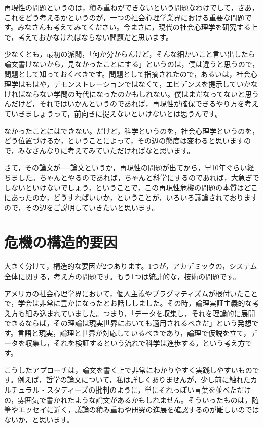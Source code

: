 \documentclass{ltjsbook}
\begin{document}
再現性の問題というのは，積み重ねができないという問題なわけでして，さあ，これをどう考えるかというのが，一つの社会心理学業界における重要な問題です。みなさんも考えてみてください。今まさに，現代の社会心理学を研究する上で，考えておかなければならない問題だと思います。

少なくとも，最初の派閥，「何か分からんけど，そんな細かいこと言い出したら論文書けないから，見なかったことにする」というのは，僕は違うと思うので，問題として知っておくべきです。問題として指摘されたので，あるいは，社会心理学はもはや，デモンストレーションではなくて，エビデンスを提示していかなければならない学問の時代になったのかもしれない。僕はまだなってないと思うんだけど，それではいかんというのであれば，再現性が確保できるやり方を考えていきましょうって，前向きに捉えないといけないとは思うんです。

なかったことにはできない。だけど，科学というのを，社会心理学というのを，どう位置づけるか，ということによって，その辺の態度は変わると思いますので，みなさんなりに考えてみていただければなと思います。

さて，その論文が──論文というか，再現性の問題が出てから，早10年ぐらい経ちました。ちゃんとやるのであれば，ちゃんと科学にするのであれば，大急ぎでしないといけないでしょう，ということで，この再現性危機の問題の本質はどこにあったのか，どうすればいいか，ということが，いろいろ議論されておりますので，その辺をご説明していきたいと思います。

\section{危機の構造的要因}

大きく分けて，構造的な要因が2つあります。1つが，アカデミックの，システム全体に関する，考え方の問題です。もう1つは統計的な，技術の問題です。

アメリカの社会心理学界において，個人主義やプラグマティズムが根付いたことで，学会は非常に豊かになったとお話ししました。その時，論理実証主義的な考え方も組み込まれていました。つまり，「データを収集し，それを理論的に展開できるならば，その理論は現実世界においても適用されるべきだ」という発想です。言語と現実，論理と世界が対応しているべきであり，論理で仮説を立て，データを収集し，それを検証するという流れで科学は進歩する，という考え方です。

こうしたアプローチは，論文を書く上で非常にわかりやすく実践しやすいものです。例えば，哲学の論文について，私は詳しくありませんが，少し前に触れたカルチュラル・スタディーズの批判のように，単にそれっぽい言葉を並べただけの，雰囲気で書かれたような論文があるかもしれません。そういったものは，随筆やエッセイに近く，議論の積み重ねや研究の進展を確認するのが難しいのではないか，と思います。
\end{document}

